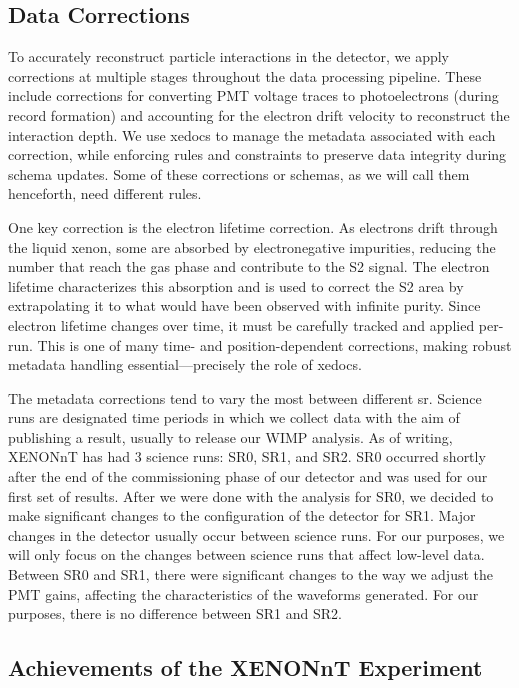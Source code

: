 \subsection{Data Corrections}

To accurately reconstruct particle interactions in the detector, we apply corrections at multiple stages throughout the data processing pipeline. These include corrections for converting PMT voltage traces to photoelectrons (during record formation) and accounting for the electron drift velocity to reconstruct the interaction depth. We use xedocs to manage the metadata associated with each correction, while enforcing rules and constraints to preserve data integrity during schema updates.
Some of these corrections or schemas, as we will call them henceforth, need different rules.


One key correction is the electron lifetime correction. As electrons drift through the liquid xenon, some are absorbed by electronegative impurities, reducing the number that reach the gas phase and contribute to the S2 signal. The electron lifetime characterizes this absorption and is used to correct the S2 area by extrapolating it to what would have been observed with infinite purity. Since electron lifetime changes over time, it must be carefully tracked and applied per-run. This is one of many time- and position-dependent corrections, making robust metadata handling essential—precisely the role of xedocs.

The metadata corrections tend to vary the most between different \acrfull{sr}. Science runs are designated time periods in which we collect data with the aim of publishing a result, usually to release our WIMP analysis. As of writing, XENONnT has had 3 science runs: SR0, SR1, and SR2. SR0 occurred shortly after the end of the commissioning phase of our detector and was used for our first set of results. After we were done with the analysis for SR0, we decided to make significant changes to the configuration of the detector for SR1. Major changes in the detector usually occur between science runs. For our purposes, we will only focus on the changes between science runs that affect low-level data. Between SR0 and SR1, there were significant changes to the way we adjust the PMT gains, affecting the characteristics of the waveforms generated. For our purposes, there is no difference between SR1 and SR2.


\subsection{Achievements of the XENONnT Experiment}


